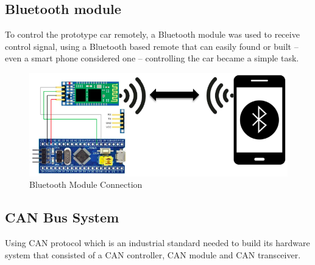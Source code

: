 \subsection{Bluetooth module}
To control the prototype car remotely, a Bluetooth module was used to receive control signal, using a Bluetooth based remote that can easily found or built –
 even a smart phone considered one – controlling the
car became a simple task.

\begin{figure}[h]
    \centering
    \includegraphics[scale=.3]{figures/9-7.png}
    \caption{Bluetooth Module Connection}
\end{figure}

\clearpage

\subsection{CAN Bus System}
Using CAN protocol which is an industrial standard needed to build its hardware system that consisted of a CAN controller, CAN module and CAN transceiver.

